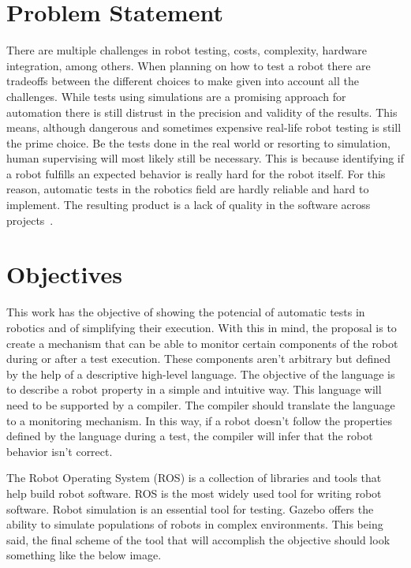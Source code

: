 \section{Problem Statement}
\label{sec:problem}

There are multiple challenges in robot testing, costs, 
complexity, hardware integration, among others.
When planning on how to test a robot there are tradeoffs between the 
different choices to make given into account all the challenges.
While tests using simulations are a promising approach for automation 
there is still distrust in the precision and validity of the results.
This means, although dangerous and sometimes expensive real-life 
robot testing is still the prime choice.
Be the tests done in the real world or resorting to simulation, 
human supervising will most likely still be necessary.
This is because identifying if a robot fulfills an expected 
behavior is really hard for the robot itself.
For this reason, automatic tests in the robotics field are 
hardly reliable and hard to implement.
The resulting product is a lack of quality in the software across projects~\cite{TestRob}.

\section{Objectives}
\label{sec:objectives}

This work has the objective of showing the potencial of automatic 
tests in robotics and of simplifying their execution.
With this in mind, the proposal is to create a mechanism that can be able 
to monitor certain components of the robot during or after a test execution.
These components aren't arbitrary but defined by the help of a descriptive high-level language.
The objective of the language is to describe a robot property in a simple and intuitive way.
This language will need to be supported by a compiler. 
The compiler should translate the language to a monitoring mechanism.
In this way, if a robot doesn't follow the properties defined by the language 
during a test, the compiler will infer that the robot behavior isn't correct.

\par

The Robot Operating System (ROS) is a collection of libraries and tools that help 
build robot software. ROS is the most widely used tool for writing robot software.
Robot simulation is an essential tool for testing. Gazebo offers the ability 
to simulate populations of robots in complex environments.
This being said, the final scheme of the tool that will accomplish the objective 
should look something like the below image.

